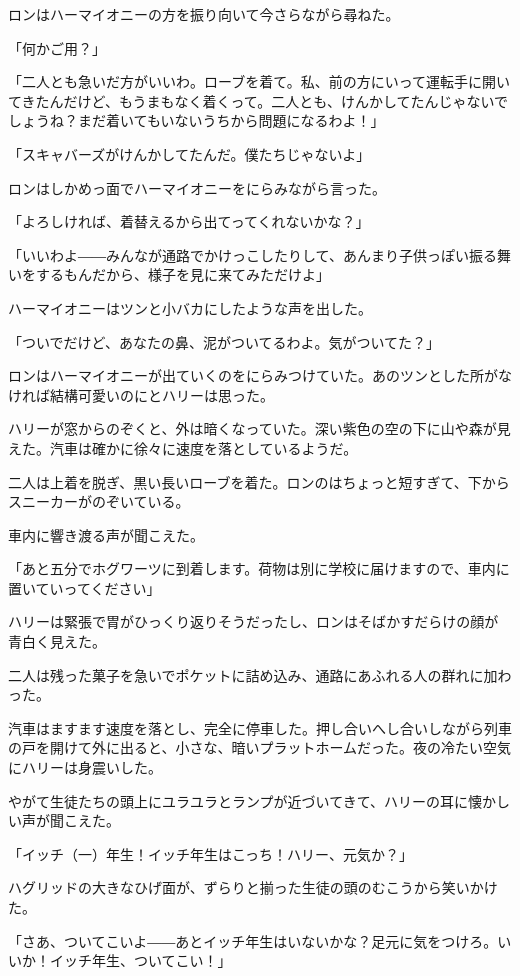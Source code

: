 \documentclass[10pt,a4paper]{article}
\begin{document}
\begin{CJK}{UTF8}{min}
ロンはハーマイオニーの方を振り向いて今さらながら尋ねた。

「何かご用？」

「二人とも急いだ方がいいわ。ローブを着て。私、前の方にいって運転手に開いてきたんだけど、もうまもなく着くって。二人とも、けんかしてたんじゃないでしょうね？まだ着いてもいないうちから問題になるわよ！」

「スキャバーズがけんかしてたんだ。僕たちじゃないよ」

ロンはしかめっ面でハーマイオニーをにらみながら言った。

「よろしければ、着替えるから出てってくれないかな？」

「いいわよ――みんなが通路でかけっこしたりして、あんまり子供っぽい振る舞いをするもんだから、様子を見に来てみただけよ」

ハーマイオニーはツンと小バカにしたような声を出した。

「ついでだけど、あなたの鼻、泥がついてるわよ。気がついてた？」

ロンはハーマイオニーが出ていくのをにらみつけていた。あのツンとした所がなければ結構可愛いのにとハリーは思った。

ハリーが窓からのぞくと、外は暗くなっていた。深い紫色の空の下に山や森が見えた。汽車は確かに徐々に速度を落としているようだ。

二人は上着を脱ぎ、黒い長いローブを着た。ロンのはちょっと短すぎて、下からスニーカーがのぞいている。

車内に響き渡る声が聞こえた。

「あと五分でホグワーツに到着します。荷物は別に学校に届けますので、車内に置いていってください」

ハリーは緊張で胃がひっくり返りそうだったし、ロンはそばかすだらけの顔が青白く見えた。

二人は残った菓子を急いでポケットに詰め込み、通路にあふれる人の群れに加わった。

汽車はますます速度を落とし、完全に停車した。押し合いへし合いしながら列車の戸を開けて外に出ると、小さな、暗いプラットホームだった。夜の冷たい空気にハリーは身震いした。

やがて生徒たちの頭上にユラユラとランプが近づいてきて、ハリーの耳に懐かしい声が聞こえた。

「イッチ（一）年生！イッチ年生はこっち！ハリー、元気か？」

ハグリッドの大きなひげ面が、ずらりと揃った生徒の頭のむこうから笑いかけた。

「さあ、ついてこいよ――あとイッチ年生はいないかな？足元に気をつけろ。いいか！イッチ年生、ついてこい！」


\end{CJK}
\end{document}
